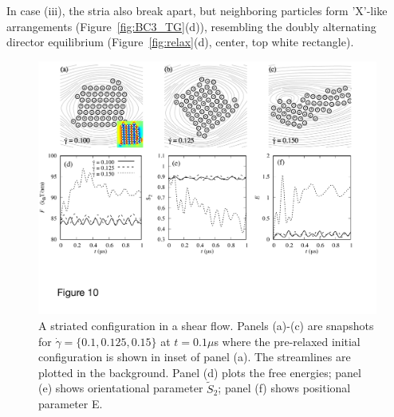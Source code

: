\documentclass[aps,prl,preprint,groupedaddress]{revtex4-2}
\begin{document}
In case (iii), the stria also break apart, but neighboring particles form
'X'-like arrangements (Figure~\ref{fig:BC3_TG}(d)), resembling the doubly alternating
director equilibrium (Figure~\ref{fig:relax}(d), center, top white rectangle).



\begin{figure}
  \begin{center}
\includegraphics[width=1.0\textwidth]{Figures/Figure10.pdf}        
  \end{center}
      \caption{\label{fig:BC3_shear}  A striated configuration in a shear flow. Panels (a)-(c) are snapshots for $\dot \gamma = \{0.1, 0.125, 0.15\}$ at $t=0.1\mu$s where the pre-relaxed initial configuration is shown in inset of panel (a). The streamlines are plotted in the background.
Panel (d) plots the free energies; panel (e) shows orientational parameter $\tilde{S}_2$; panel (f) shows positional parameter E.
    }
\end{figure}
\end{document}
